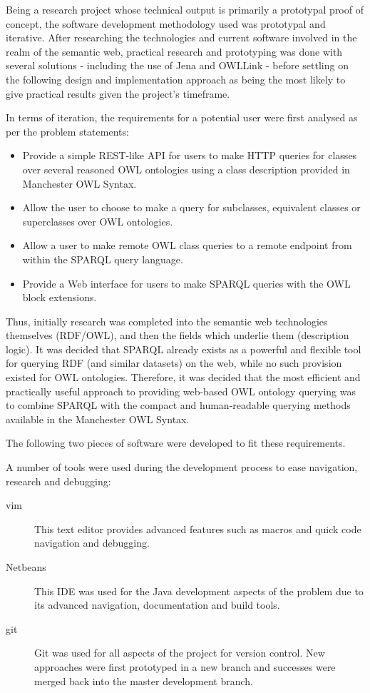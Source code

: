 \documentclass{article}
\begin{document}
Being a research project whose technical output is primarily a prototypal proof
of concept, the software development methodology used was prototypal and
iterative. After researching the technologies and current software involved in
the realm of the semantic web, practical research and prototyping was done with 
several solutions - including the use of Jena and OWLLink - before settling on
the following design and implementation approach as being the most likely to
give practical results given the project's timeframe.

In terms of iteration, the requirements for a potential user were first analysed 
as per the problem statements:

\begin{itemize}
    \item Provide a simple REST-like API for users to make HTTP queries for
    classes over several reasoned OWL ontologies using a class description
    provided in Manchester OWL Syntax.
    \item Allow the user to choose to make a query for subclasses, equivalent
    classes or superclasses over OWL ontologies.
    \item Allow a user to make remote OWL class queries to a remote endpoint from 
    within the SPARQL query language.
    \item Provide a Web interface for users to make SPARQL queries with the OWL
    block extensions.
\end{itemize}

Thus, initially research was completed into the semantic web technologies
themselves (RDF/OWL), and then the fields which underlie them (description
logic). It was decided that SPARQL already exists as a powerful and flexible
tool for querying RDF (and similar datasets) on the web, while no such provision
existed for OWL ontologies. Therefore, it was decided that the most efficient
and practically useful approach to providing web-based OWL ontology querying was
to combine SPARQL with the compact and human-readable querying methods available
in the Manchester OWL Syntax. 

The following two pieces of software were developed to fit these requirements.

A number of tools were used during the development process to ease navigation,
research and debugging:

\begin{description}
    \item[vim] This text editor provides advanced features such as macros and
    quick code navigation and debugging.
    \item[Netbeans] This IDE was used for the Java development aspects of the
    problem due to its advanced navigation, documentation and build tools.
    \item[git] Git was used for all aspects of the project for version control.
    New approaches were first prototyped in a new branch and successes were
    merged back into the master development branch.
\end{description}
\end{document}
